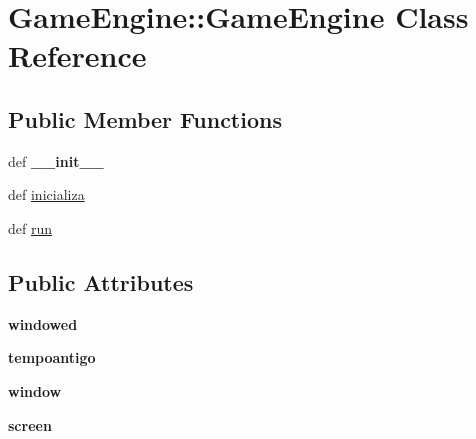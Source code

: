 \hypertarget{class_game_engine_1_1_game_engine}{
\section{GameEngine::GameEngine Class Reference}
\label{class_game_engine_1_1_game_engine}
}
\subsection*{Public Member Functions}
\begin{CompactItemize}
\item 
\hypertarget{class_game_engine_1_1_game_engine_525ae871c88b7298e0e6fdf41f3e1a69}{
def \textbf{\_\-\_\-init\_\-\_\-}}
\label{class_game_engine_1_1_game_engine_525ae871c88b7298e0e6fdf41f3e1a69}

\item 
def \hyperlink{class_game_engine_1_1_game_engine_e5520eb2e80e74026b44cfe5209390bd}{inicializa}
\item 
def \hyperlink{class_game_engine_1_1_game_engine_b5688ddd57efff581aae796bccfdeeb1}{run}
\end{CompactItemize}
\subsection*{Public Attributes}
\begin{CompactItemize}
\item 
\hypertarget{class_game_engine_1_1_game_engine_235c8c2bcf23692a5c8012c69bf88ade}{
\textbf{windowed}}
\label{class_game_engine_1_1_game_engine_235c8c2bcf23692a5c8012c69bf88ade}

\item 
\hypertarget{class_game_engine_1_1_game_engine_17ba1f1fccdfd0cdd7e398fc19bddd3a}{
\textbf{tempoantigo}}
\label{class_game_engine_1_1_game_engine_17ba1f1fccdfd0cdd7e398fc19bddd3a}

\item 
\hypertarget{class_game_engine_1_1_game_engine_2757728377e5b728d603c36abf55f0b4}{
\textbf{window}}
\label{class_game_engine_1_1_game_engine_2757728377e5b728d603c36abf55f0b4}

\item 
\hypertarget{class_game_engine_1_1_game_engine_d3cb13ecae9a9bb0cc3ed142d8adfbdd}{
\textbf{screen}}
\label{class_game_engine_1_1_game_engine_d3cb13ecae9a9bb0cc3ed142d8adfbdd}

\end{CompactItemize}


